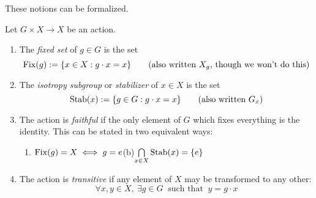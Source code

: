 \goodbreak

These notions can be formalized.



\begin{defn}{}{}
Let $G\times X\to X$ be an action.
\begin{enumerate}
  \item The \emph{fixed set} of $g\in G$ is the set
  \[
  	\operatorname{Fix}(g):=\{x\in X:g\cdot x=x\} \tag{also written $X_g$, though we won't do this}
  \]
  \item The \emph{isotropy subgroup} or \emph{stabilizer} of $x\in X$ is the set
  \[
  	\operatorname{Stab}(x):=\{g\in G:g\cdot x=x\} \tag{also written $G_x$}
  \] 
  \item The action is \emph{faithful} if the only element of $G$ which fixes everything is the identity. This can be stated in two equivalent ways:
  \begin{enumerate}
    \item $\operatorname{Fix}(g)=X\iff g=e$\qquad\qquad\qquad (b)\lstsp$\bigcap\limits_{x\in X}\operatorname{Stab}(x)=\{e\}$
  \end{enumerate}
  \item The action is \emph{transitive} if any element of $X$ may be transformed to any other:
	\[
		\forall x,y\in X,\ \exists g\in G\ \text{ such that }\  y=g\cdot x
	\]
\end{enumerate}
\end{defn}

